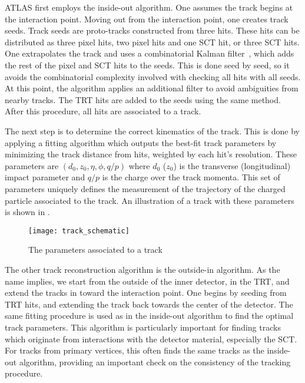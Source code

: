 ATLAS first employs the inside-out algorithm.
One assumes the track begins at the interaction point.
Moving out from the interaction point, one creates track seeds.
Track seeds are proto-tracks constructed from three hits.
These hits can be distributed as three pixel hits, two pixel hits and one SCT hit, or three SCT hits.
One extrapolates the track and uses a combinatorial Kalman filter~\cite{ATLAS-CONF-2012-042}, which adds the rest of the pixel and SCT hits to the seeds.
This is done seed by seed, so it avoids the combinatorial complexity involved with checking all hits with all seeds.
At this point, the algorithm applies an additional filter to avoid ambiguities from nearby tracks.
The TRT hits are added to the seeds using the same method.
After this procedure, all hits are associated to a track.

The next step is to determine the correct kinematics of the track.
This is done by applying a fitting algorithm which outputs the best-fit track parameters by minimizing the track distance from hits, weighted by each hit's resolution.
These parameters are $(d_0, z_0, \eta, \phi, q/p)$ where $d_0$ ($z_0$) is the transverse (longitudinal) impact parameter and $q/p$ is the charge over the track momenta.
This set of parameters uniquely defines the measurement of the trajectory of the charged particle associated to the track.
An illustration of a track with these parameters is shown in .

\begin{figure}
\caption{The parameters associated to a track}
\label{fig:track_schematic}
\texttt{[image: track\_schematic]}
\end{figure}

The other track reconstruction algorithm is the outside-in algorithm.
As the name implies, we start from the outside of the inner detector, in the TRT, and extend the tracks in toward the interaction point.
One begins by seeding from TRT hits, and extending the track back towards the center of the detector.
The same fitting procedure is used as in the inside-out algorithm to find the optimal track parameters.
This algorithm is particularly important for finding tracks which originate from interactions with the detector material, especially the SCT.
For tracks from primary vertices, this often finds the same tracks as the inside-out algorithm, providing an important check on the consistency of the tracking procedure.

